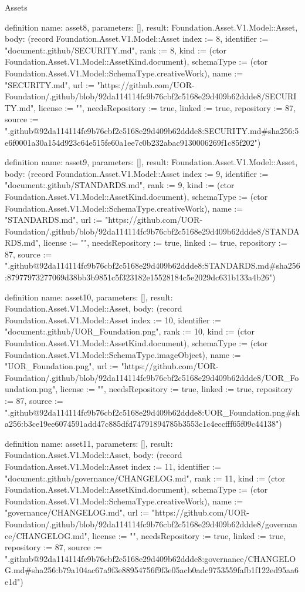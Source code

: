 \begin{lexlean}{Assets}
\begin{semanticmodule}
definition{
  name: asset8,
  parameters: [],
  result: Foundation.Asset.V1.Model::Asset,
  body: (record Foundation.Asset.V1.Model::Asset {index := 8, identifier := "document:.github/SECURITY.md", rank := 8, kind := (ctor Foundation.Asset.V1.Model::AssetKind.document), schemaType := (ctor Foundation.Asset.V1.Model::SchemaType.creativeWork), name := "SECURITY.md", url := "https://github.com/UOR-Foundation/.github/blob/92da114114fc9b76cbf2c5168e29d409b62ddde8/SECURITY.md", license := "", needsRepository := true, linked := true, repository := 87, source := ".github@92da114114fc9b76cbf2c5168e29d409b62ddde8:SECURITY.md#sha256:5e6f0001a30a154d923c64e515fe60a1ee7c0b232abac9130006269f1c85f202"})
}

definition{
  name: asset9,
  parameters: [],
  result: Foundation.Asset.V1.Model::Asset,
  body: (record Foundation.Asset.V1.Model::Asset {index := 9, identifier := "document:.github/STANDARDS.md", rank := 9, kind := (ctor Foundation.Asset.V1.Model::AssetKind.document), schemaType := (ctor Foundation.Asset.V1.Model::SchemaType.creativeWork), name := "STANDARDS.md", url := "https://github.com/UOR-Foundation/.github/blob/92da114114fc9b76cbf2c5168e29d409b62ddde8/STANDARDS.md", license := "", needsRepository := true, linked := true, repository := 87, source := ".github@92da114114fc9b76cbf2c5168e29d409b62ddde8:STANDARDS.md#sha256:87977973277069d38bb3b9851c5f323182e15528184c5e2029dc631b133a4b26"})
}

definition{
  name: asset10,
  parameters: [],
  result: Foundation.Asset.V1.Model::Asset,
  body: (record Foundation.Asset.V1.Model::Asset {index := 10, identifier := "document:.github/UOR_Foundation.png", rank := 10, kind := (ctor Foundation.Asset.V1.Model::AssetKind.document), schemaType := (ctor Foundation.Asset.V1.Model::SchemaType.imageObject), name := "UOR_Foundation.png", url := "https://github.com/UOR-Foundation/.github/blob/92da114114fc9b76cbf2c5168e29d409b62ddde8/UOR_Foundation.png", license := "", needsRepository := true, linked := true, repository := 87, source := ".github@92da114114fc9b76cbf2c5168e29d409b62ddde8:UOR_Foundation.png#sha256:b3ce19ee6074591add47c885dfd74791894785b3553c1c4eccfff65f09c44138"})
}

definition{
  name: asset11,
  parameters: [],
  result: Foundation.Asset.V1.Model::Asset,
  body: (record Foundation.Asset.V1.Model::Asset {index := 11, identifier := "document:.github/governance/CHANGELOG.md", rank := 11, kind := (ctor Foundation.Asset.V1.Model::AssetKind.document), schemaType := (ctor Foundation.Asset.V1.Model::SchemaType.creativeWork), name := "governance/CHANGELOG.md", url := "https://github.com/UOR-Foundation/.github/blob/92da114114fc9b76cbf2c5168e29d409b62ddde8/governance/CHANGELOG.md", license := "", needsRepository := true, linked := true, repository := 87, source := ".github@92da114114fc9b76cbf2c5168e29d409b62ddde8:governance/CHANGELOG.md#sha256:b79a104ac67a9f3e88954756f9f3e05acb0adc9753559fafb1f122ed95aa6e1d"})
}


\end{semanticmodule}
\end{lexlean}
